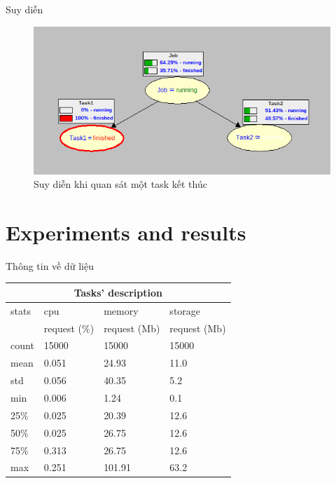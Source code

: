 \documentclass[11pt,xcolor={dvipsnames}, aspectratio=169]{beamer}
\begin{document}
\begin{frame}
{Suy diễn}
\begin{figure}[h!]
	\centering 
	\includegraphics[scale=0.6]{images/task_finished_observation.png}
	\caption{Suy diễn khi quan sát một task kết thúc}
	\label{fig:job_network}
\end{figure}
\end{frame}

\section{Experiments and results}

\begin{frame}
{Thông tin về dữ liệu}

\begin{table}[h!]
	\centering
        \begin{tabular}{| p{1.5cm} | p{1.5cm} | p{1.5cm} | p{1.5cm} |}
            \hline
            \multicolumn{4}{|c|}{Tasks' description} \\
            \hline
            stats & cpu & memory & storage \\
            	 & request (\%) & request (Mb) & request (Mb) \\
            \hline 
            \hline
            count & 15000 & 15000 & 15000 \\
            \hline
            mean & 0.051 & 24.93 & 11.0 \\
            \hline
            std & 0.056 & 40.35 & 5.2 \\
            \hline
            min & 0.006 & 1.24 & 0.1 \\
            \hline 
            25\% & 0.025 & 20.39 & 12.6 \\
            \hline 
            50\% & 0.025 & 26.75 & 12.6 \\
            \hline
            75\% & 0.313 & 26.75 & 12.6 \\
            \hline 
            max & 0.251 & 101.91 & 63.2 \\
            \hline
        \end{tabular}
\end{table}
\end{frame}
\end{document}
